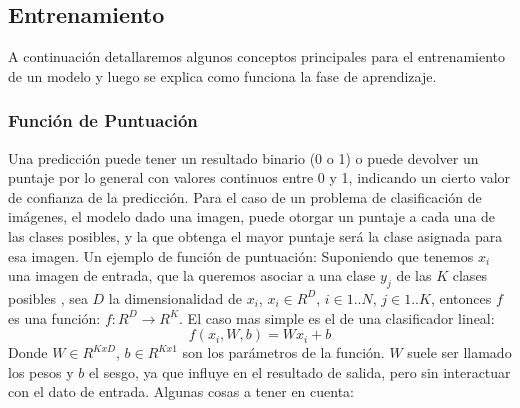 \documentclass[a4paper,11pt,spanish]{book}
\begin{document}
      \subsection{Entrenamiento}
	A continuación detallaremos algunos conceptos principales para el entrenamiento de un modelo y luego se explica como funciona la fase de aprendizaje.
	\subsubsection{Función de Puntuación}
	  Una predicción puede tener un resultado binario (0 o 1) o puede devolver un puntaje por lo general con valores continuos entre 0 y 1, indicando un cierto valor de confianza 
	  de la predicción. Para el caso de un problema de clasificación de imágenes, el modelo dado una imagen, puede otorgar un puntaje a cada una de las clases posibles, 
	  y la que obtenga el mayor puntaje será la clase asignada para esa imagen.
	  Un ejemplo de función de puntuación:
	  Suponiendo que tenemos $x_{i}$  una imagen de entrada, que la queremos asociar a una clase $y_{j}$ de las $K$ clases posibles , sea $D$ la dimensionalidad de $x_{i}$, $x_{i} \in R^D$,
	  $i \in 1..N$, $j \in 1..K$, entonces $f$ es una función: $f:R^D {\rightarrow} R^K$. El caso mas simple es el de una clasificador lineal:\\
	  \begin{equation}
	    f(x_{i}, W, b) = W x_{i} + b
	  \end{equation}
	  Donde $W \in R^{KxD}$, $b \in R^{Kx1}$ son los parámetros de la función. $W$ suele ser llamado los pesos y $b$ el sesgo, ya que influye en el resultado de salida, pero sin 
	  interactuar con el dato de entrada.
	  Algunas cosas a tener en cuenta:
\end{document}
